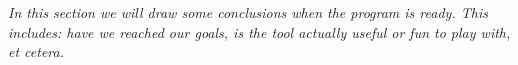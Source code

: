 \textit{In this section we will draw some conclusions when the program is ready. This includes: have we reached our goals, is the tool actually useful or fun to play with, et cetera.}